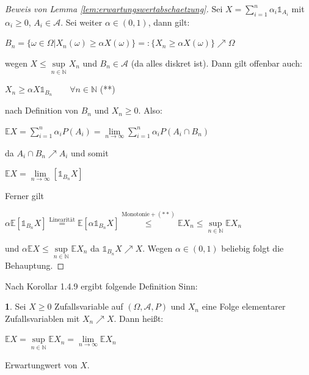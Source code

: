 \documentclass[10pt,a4paper]{report}
\numberwithin{equation}{section}
\numberwithin{figure}{section}
\theoremstyle{plain}
\theoremstyle{definition}
\newtheorem{defn}[thm]{\protect\definitionname}
\theoremstyle{remark}
\theoremstyle{plain}
\providecommand{\definitionname}{Definition}
\newcommand{\1}{ \mathbb{1} } %
\begin{document}
\begin{proof}[Beweis von Lemma \ref{lem:erwartungswertabschaetzung}]
  Sei $X=\sum\limits_{i=1}^n\alpha_i\1_{A_i}$ mit $\alpha_i \geq 0$,
  $A_i \in \mathcal{A}$. Sei weiter $\alpha \in (0,1)$, dann gilt:
  \begin{center}
    $B_n=\{\omega \in \Omega|X_n(\omega)\geq \alpha
    X(\omega)\}=:\{X_n\geq \alpha X(\omega)\}\nearrow \Omega$
  \end{center}
  wegen $X \leq \sup\limits_{n\in \mathbb{N}} X_n$ und $B_n \in
  \mathcal{A}$ (da alles diskret ist). Dann gilt offenbar auch:
  \begin{center}
    $X_n \geq \alpha X\1_{B_n} \qquad \forall n \in \mathbb{N}$ (**)
  \end{center}
  nach Definition von $B_n$ und $X_n\geq 0$. Also:
  \begin{center}
    $\mathbb{E}X=\sum\limits_{i=1}^n\alpha_i P(A_i)=\lim\limits_{n \to
      \infty} \sum\limits_{i=1}^n\alpha_i P(A_i\cap B_n)$
  \end{center}
  da $A_i\cap B_n \nearrow A_i$ und somit
  \begin{center}
    $\mathbb{E}X=\lim\limits_{n \to \infty}[\1_{B_n}X]$
  \end{center}
  Ferner gilt
  \begin{center}
    $\alpha
    \mathbb{E}[\1_{B_n}X]\overset{\text{Linearität}}{=}\mathbb{E}[\alpha
    \1_{B_n}X]\overset{\text{Monotonie}+(**)}{\leq}\mathbb{E}X_n\leq\sup\limits_{n\in
      \mathbb{N}}\mathbb{E}X_n$
  \end{center}
  und $\alpha \mathbb{E}X\leq \sup\limits_{n\in \mathbb{N}}\mathbb{E}X_n$ da $\1_{B_n}X\nearrow X$. Wegen $\alpha \in (0,1)$ beliebig folgt die Behauptung.
\end{proof}
Nach Korollar 1.4.9 ergibt folgende Definition Sinn:
\begin{defn}  %
  Sei $X\geq 0$ Zufallsvariable auf $(\Omega,\mathcal{A},P)$ und $X_n$ eine Folge
  elementarer Zufallsvariablen mit $X_n\nearrow X$. Dann heißt:
  \begin{center}
    $\mathbb{E}X=\sup\limits_{n\in
      \mathbb{N}}\mathbb{E}X_n=\lim\limits_{n \to
      \infty}\mathbb{E}X_n$
  \end{center}
  Erwartungwert von $X$.
\end{defn}
\end{document}
